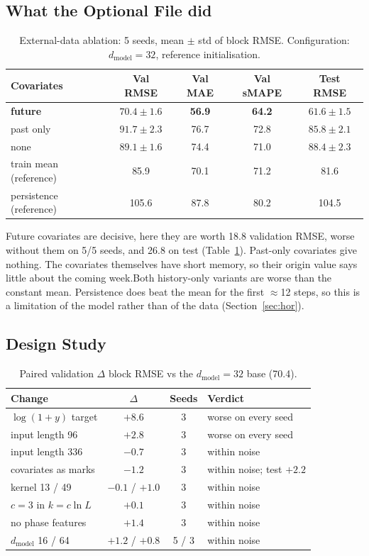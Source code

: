 \documentclass[11pt,a4paper]{article}
\begin{document}
\subsection{What the Optional File did}
\begin{table}[htbp]\centering\small
\caption{External-data ablation: 5 seeds, mean $\pm$ std of block RMSE. Configuration: $d_{\text{model}}=32$, reference initialisation.}
\label{tab:exog}
{%
\begin{tabular}{lcccc}
\toprule
Covariates & Val RMSE & Val MAE & Val sMAPE & Test RMSE\\
\midrule
\textbf{future} & $\mathbf{70.4\pm1.6}$ & \textbf{56.9} & \textbf{64.2} & $\mathbf{61.6\pm1.5}$\\
past only & $91.7\pm2.3$ & 76.7 & 72.8 & $85.8\pm2.1$\\
none & $89.1\pm1.6$ & 74.4 & 71.0 & $88.4\pm2.3$\\
\midrule
train mean (reference) & 85.9 & 70.1 & 71.2 & 81.6\\
persistence (reference) & 105.6 & 87.8 & 80.2 & 104.5\\
\bottomrule
\end{tabular}}
\end{table}

\noindent Future covariates are decisive, here they are worth 18.8 validation RMSE, worse without them on 5/5 seeds, and 26.8 on test (Table~\ref{tab:exog}). Past-only covariates give nothing. The covariates themselves have short memory, so their origin value says little about the coming week.Both history-only variants are worse than the constant mean. Persistence does beat the mean for the first $\approx$12 steps, so this is a limitation of the model rather than of the data (Section~\ref{sec:hor}).


\subsection{Design Study}
\begin{table}[htbp]\centering\small
\caption{Paired validation $\Delta$ block RMSE vs the $d_{\text{model}}{=}32$ base (70.4).}
\label{tab:design}
{%
\begin{tabular}{lccl}
\toprule
Change & $\Delta$ & Seeds & Verdict\\
\midrule
$\log(1+y)$ target & $+8.6$ & 3 & worse on every seed\\
input length 96 & $+2.8$ & 3 & worse on every seed\\
input length 336 & $-0.7$ & 3 & within noise\\
covariates as marks & $-1.2$ & 3 & within noise; test $+2.2$\\
kernel 13 / 49 & $-0.1$ / $+1.0$ & 3 & within noise\\
$c=3$ in $k=c\ln L$ & $+0.1$ & 3 & within noise\\
no phase features & $+1.4$ & 3 & within noise\\
$d_{\text{model}}$ 16 / 64 & $+1.2$ / $+0.8$ & 5 / 3 & within noise\\
\bottomrule
\end{tabular}}
\end{table}
\end{document}
